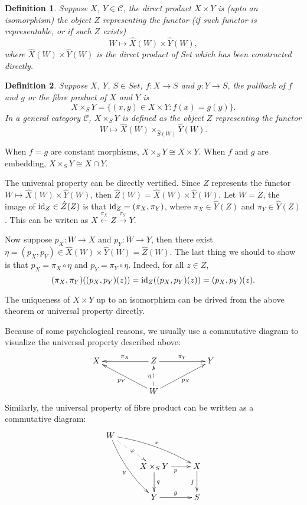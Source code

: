 \documentclass[9pt]{extarticle}
\theoremstyle{plain}
\newtheorem{defi}{Definition}
\newcommand{\cc}{\mathcal{C}}
\begin{document}
\begin{defi}
	Suppose $X$, $Y\in\cc$, the direct product $X\times Y$ is (upto an isomorphism) the object $Z$ representing the functor (if such functor is representable, or if such $Z$ exists)
	\[
		W\mapsto \hat{X}(W)\times\hat{Y}(W),
	\]
	where $\hat{X}(W)\times\hat{Y}(W)$ is the direct product of \textit{Set} which has been constructed directly.
\end{defi}
\begin{defi}
	Suppose $X$, $Y$, $S\in\textit{Set}$, $f:X\to S$ and $g:Y\to S$, the pullback of $f$ and $g$ or the fibre product of $X$ and $Y$ is
	\[
		X\times_S Y=\{(x,y)\in X\times Y:f(x)=g(y)\}.
	\]
	In a general category $\cc$, $X\times_SY$ is defined as the object $Z$ representing the functor
	\[
		W\mapsto \hat{X}(W)\times_{\hat{S}(W)}\hat{Y}(W).
	\]
\end{defi}
When $f=g$ are constant morphisms, $X\times_S Y\cong X\times Y$. When $f$ and $g$ are embedding, $X\times_S Y\cong X\cap Y$.

The universal property can be directly vertified. Since $Z$ represents the functor $W\mapsto \hat{X}(W)\times\hat{Y}(W)$, then $\hat{Z}(W)=\hat{X}(W)\times\hat{Y}(W)$. Let $W=Z$, the image of $\operatorname{id}_Z\in \hat{Z}(Z)$ is that $\operatorname{id}_Z=(\pi_X,\pi_Y)$, where $\pi_X\in \hat{Y}(Z)$ and $\pi_Y\in \hat{Y}(Z)$. This can be writen as
$X\xleftarrow{\pi_X} Z \xrightarrow{\pi_Y}Y$.

Now suppose $p_X:W\to X$ and $p_Y:W\to Y$, then there exist $\eta=(p_X,p_Y)\in \hat{X}(W)\times\hat{Y}(W)= \hat{Z}(W)$. The last thing we should to show is that $p_X=\pi_X\circ \eta$ and $p_Y=\pi_Y\circ \eta$. Indeed, for all $z\in Z$,
\[
	(\pi_X,\pi_Y)((p_X,p_Y)(z))=\operatorname{id}_Z((p_X,p_Y)(z))=(p_X,p_Y)(z).
\]

The uniqueness of $X\times Y$ up to an isomorphism can be drived from the above theorem or universal property directly. 

Because of some psychological reasons, we usually use a commutative diagram to visualize the universal property described above:
\[
\begin{xy}
	\xymatrix
	{
		X &&\ar[ll]_{\pi_X}Z\ar[rr]^{\pi_Y}&&Y \\
		&&\ar[urr]_{p_X}W\ar@{-->}[u]^{\eta}\ar[ull]^{p_Y}&&
	}
\end{xy}
\]
Similarly, the universal property of fibre product can be written as a commutative diagram:
\[
\begin{xy}
	\xymatrix{
		W \ar@/_/[ddr]_y \ar@{.>}[dr]|{\varphi} \ar@/^/[drr]^x \\  
	 	& X \times_S Y \ar[d]^q \ar[r]_p & X \ar[d]_f \\
	 	& Y \ar[r]^g & S
	}
\end{xy}
\]
\end{document}
